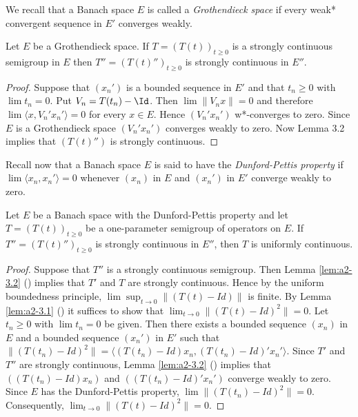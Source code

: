 We recall that a Banach space $E$ is called a \emph{Grothendieck space} if every weak* convergent sequence in $E'$ converges weakly.
\begin{theorem}\label{thm:a2-3.3}
Let $E$ be a Grothendieck space.
If $T=(T(t))_{t \geq 0}$ is a strongly continuous semigroup in $E$ then $T'' = (T(t)'')_{t \geq 0}$ is strongly continuous in $E''$.
\end{theorem}

\begin{proof}
Suppose that $(x_{n}')$ is a bounded sequence in $E'$ and that $t_{n} \geq 0$ with $\lim t_{n} = 0$.
Put $V_{n} = T(t_{n}) - \Id$.
Then $\lim \|V_{n}x\| = 0$ and therefore $\lim \langle x, V_{n}'x_{n}' \rangle = 0$ for every $x \in E$.
Hence $(V_{n}'x_{n}')$ w*-converges to zero.
Since $E$ is a Grothendieck space $(V_{n}'x_{n}')$ converges weakly to zero.
Now Lemma 3.2 implies that $(T(t)'')$ is strongly continuous.
\end{proof}

Recall now that a Banach space $E$ is said to have the \emph{Dunford-Pettis property} if $\lim \langle x_{n},x_{n}' \rangle = 0$ whenever $(x_{n})$ in $E$ and $(x_{n}')$ in $E'$ converge weakly to zero.

\begin{theorem}\label{thm:a2-3.4}
Let $E$ be a Banach space with the Dunford-Pettis property and let $T = (T(t))_{t \geq 0}$ be a one-parameter semigroup of operators on $E$.
If $T'' = (T(t)'')_{t \geq 0}$ is strongly continuous in $E''$, then $T$ is uniformly continuous.
\end{theorem}

\begin{proof}
Suppose that $T''$ is a strongly continuous semigroup.
Then Lemma \ref{lem:a2-3.2} () implies that $T'$ and $T$ are strongly continuous.
Hence by the uniform boundedness principle, $\lim \sup_{t \to 0} \|(T(t) - Id)\|$ is finite.
By Lemma \ref{lem:a2-3.1} () it suffices to show that $\lim_{t \to 0} \|(T(t) - Id)^2\| = 0$.
Let $t_{n} \geq 0$ with $\lim t_{n} = 0$ be given.
Then there exists a bounded sequence $(x_{n})$ in $E$ and a bounded sequence $(x_{n}')$ in $E'$ such that $\|(T(t_{n}) - Id)^2\| = \langle (T(t_{n}) - Id)x_{n}, (T(t_{n}) - Id)'x_{n}' \rangle$.
Since $T'$ and $T''$ are strongly continuous, Lemma \ref{lem:a2-3.2} () implies that $((T(t_{n}) - Id)x_{n})$ and $((T(t_{n}) - Id)'x_{n}')$ converge weakly to zero.
Since $E$ has the Dunford-Pettis property, $\lim \|(T(t_{n}) - Id)^2\| = 0$.
Consequently, $\lim_{t \to 0} \|(T(t) - Id)^2\| = 0$.
\end{proof}

